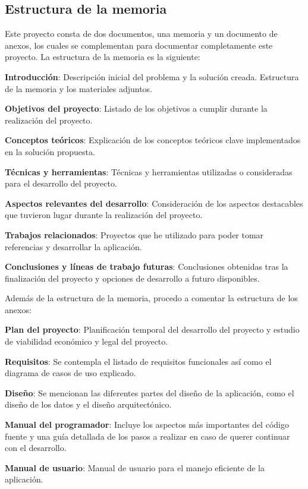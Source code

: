 \subsection{Estructura de la memoria}
Este proyecto consta de dos documentos, una memoria y un documento de anexos, los cuales se complementan para documentar completamente este proyecto.
La estructura de la memoria es la siguiente:

\textbf{Introducción}:  Descripción inicial del problema y la solución creada. Estructura de la memoria y los materiales adjuntos.

\textbf{Objetivos del proyecto}: Listado de los objetivos a cumplir durante la realización del proyecto.

\textbf{Conceptos teóricos}: Explicación de los conceptos teóricos clave implementados en la solución propuesta.

\textbf{Técnicas y herramientas}: Técnicas y herramientas utilizadas o consideradas para el desarrollo del proyecto.

\textbf{Aspectos relevantes del desarrollo}: Consideración de los aspectos destacables que tuvieron lugar durante la realización del proyecto.

\textbf{Trabajos relacionados}: Proyectos que he utilizado para poder tomar referencias y desarrollar la aplicación.

\textbf{Conclusiones y líneas de trabajo futuras}: Conclusiones obtenidas tras la finalización del proyecto y opciones de desarrollo a futuro disponibles.

Además de la estructura de la memoria, procedo a comentar la estructura de los anexos:

\textbf{Plan del proyecto}: Planificación temporal del desarrollo del proyecto y estudio de viabilidad económico y legal del proyecto.

\textbf{Requisitos}: Se contempla el listado de requisitos funcionales así como el diagrama de casos de uso explicado.

\textbf{Diseño}: Se mencionan las diferentes partes del diseño de la aplicación, como el diseño de los datos y el diseño arquitectónico.

\textbf{Manual del programador}: Incluye los aspectos más importantes del código fuente y una guía detallada de los pasos a realizar en caso de querer continuar con el desarrollo.

\textbf{Manual de usuario}: Manual de usuario para el  manejo eficiente de la aplicación.


